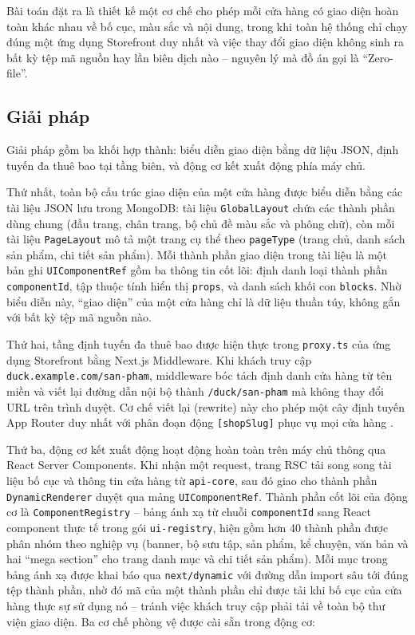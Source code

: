 \documentclass[../main.tex]{subfiles}
\begin{document}
Bài toán đặt ra là thiết kế một cơ chế cho phép mỗi cửa hàng có giao diện hoàn toàn khác nhau về bố cục, màu sắc và nội dung, trong khi toàn hệ thống chỉ chạy đúng một ứng dụng Storefront duy nhất và việc thay đổi giao diện không sinh ra bất kỳ tệp mã nguồn hay lần biên dịch nào -- nguyên lý mà đồ án gọi là ``Zero-file''.

\subsection{Giải pháp}
\label{subsection:5.2.2}

Giải pháp gồm ba khối hợp thành: biểu diễn giao diện bằng dữ liệu JSON, định tuyến đa thuê bao tại tầng biên, và động cơ kết xuất động phía máy chủ.

Thứ nhất, toàn bộ cấu trúc giao diện của một cửa hàng được biểu diễn bằng các tài liệu JSON lưu trong MongoDB: tài liệu \texttt{GlobalLayout} chứa các thành phần dùng chung (đầu trang, chân trang, bộ chủ đề màu sắc và phông chữ), còn mỗi tài liệu \texttt{PageLayout} mô tả một trang cụ thể theo \texttt{pageType} (trang chủ, danh sách sản phẩm, chi tiết sản phẩm). Mỗi thành phần giao diện trong tài liệu là một bản ghi \texttt{UIComponentRef} gồm ba thông tin cốt lõi: định danh loại thành phần \texttt{componentId}, tập thuộc tính hiển thị \texttt{props}, và danh sách khối con \texttt{blocks}. Nhờ biểu diễn này, ``giao diện'' của một cửa hàng chỉ là dữ liệu thuần túy, không gắn với bất kỳ tệp mã nguồn nào.

Thứ hai, tầng định tuyến đa thuê bao được hiện thực trong \texttt{proxy.ts} của ứng dụng Storefront bằng Next.js Middleware. Khi khách truy cập \texttt{duck.example.com/san-pham}, middleware bóc tách định danh cửa hàng từ tên miền và viết lại đường dẫn nội bộ thành \texttt{/duck/san-pham} mà không thay đổi URL trên trình duyệt. Cơ chế viết lại (rewrite) này cho phép một cây định tuyến App Router duy nhất với phân đoạn động \texttt{[shopSlug]} phục vụ mọi cửa hàng \cite{nextjs_docs}.

Thứ ba, động cơ kết xuất động hoạt động hoàn toàn trên máy chủ thông qua React Server Components. Khi nhận một request, trang RSC tải song song tài liệu bố cục và thông tin cửa hàng từ \texttt{api-core}, sau đó giao cho thành phần \texttt{DynamicRenderer} duyệt qua mảng \texttt{UIComponentRef}. Thành phần cốt lõi của động cơ là \texttt{ComponentRegistry} -- bảng ánh xạ từ chuỗi \texttt{componentId} sang React component thực tế trong gói \texttt{ui-registry}, hiện gồm hơn 40 thành phần được phân nhóm theo nghiệp vụ (banner, bộ sưu tập, sản phẩm, kể chuyện, văn bản và hai ``mega section'' cho trang danh mục và chi tiết sản phẩm). Mỗi mục trong bảng ánh xạ được khai báo qua \texttt{next/dynamic} với đường dẫn import sâu tới đúng tệp thành phần, nhờ đó mã của một thành phần chỉ được tải khi bố cục của cửa hàng thực sự sử dụng nó -- tránh việc khách truy cập phải tải về toàn bộ thư viện giao diện. Ba cơ chế phòng vệ được cài sẵn trong động cơ:
\end{document}
